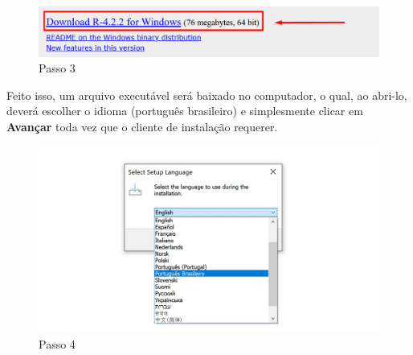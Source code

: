 \documentclass[
  letterpaper,
  DIV=11,
  numbers=noendperiod]{scrreprt}
\begin{document}
\begin{figure}

{\centering \includegraphics[width=1\textwidth,height=\textheight]{./figuras_tutorialR/install_Windows2.png}

}

\caption{Passo 3}

\end{figure}

Feito isso, um arquivo executável será baixado no computador, o qual, ao
abri-lo, deverá escolher o idioma (português brasileiro) e simplesmente
clicar em \textbf{Avançar} toda vez que o cliente de instalação
requerer.

\begin{figure}

{\centering \includegraphics[width=1\textwidth,height=\textheight]{./figuras_tutorialR/install_Windows3.jpg}

}

\caption{Passo 4}

\end{figure}
\end{document}
